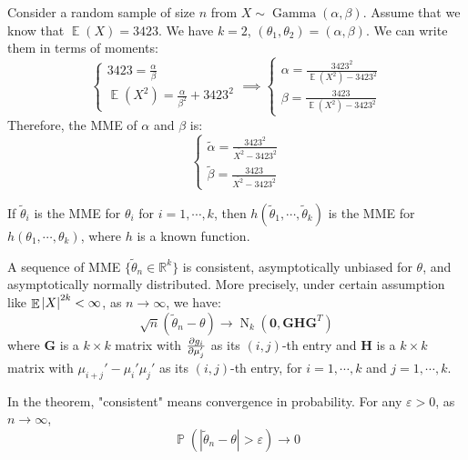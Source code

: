 \documentclass{huhtakm-template-book-v2}
\DeclareMathOperator{\prob}{\mathbb{P}}
\DeclareMathOperator{\E}{\mathbb{E}}
\DeclareMathOperator{\N}{N}
\DeclareMathOperator{\Gam}{Gamma}
\begin{document}
\begin{eg}
	Consider a random sample of size $n$ from $X\sim\Gam(\alpha,\beta)$. Assume that we know that $\E(X)=3423$. We have $k=2$, $(\theta_{1},\theta_{2})=(\alpha,\beta)$. We can write them in terms of moments:
	\begin{equation*}
		\begin{cases}
			3423=\frac{\alpha}{\beta}\\
			\E(X^{2})=\frac{\alpha}{\beta^{2}}+3423^{2}
		\end{cases}\implies\begin{cases}
			\alpha=\frac{3423^{2}}{\E(X^{2})-3423^{2}}\\
			\beta=\frac{3423}{\E(X^{2})-3423^{2}}
		\end{cases}
	\end{equation*}
	Therefore, the MME of $\alpha$ and $\beta$ is:
	\begin{equation*}
		\begin{cases}
			\widetilde{\alpha}=\frac{3423^{2}}{\overline{X^{2}}-3423^{2}}\\
			\widetilde{\beta}=\frac{3423}{\overline{X^{2}}-3423^{2}}
		\end{cases}
	\end{equation*}
\end{eg}
\begin{lem}
	If $\widetilde{\theta}_{i}$ is the MME for $\theta_{i}$ for $i=1,\cdots,k$, then $h(\widetilde{\theta}_{1},\cdots,\widetilde{\theta}_{k})$ is the MME for $h(\theta_{1},\cdots,\theta_{k})$, where $h$ is a known function.
\end{lem}
\begin{thm}
	\label{Chapter 2 (Thoerem) Sequence of MME is asympt. normal}
	A sequence of MME $\{\widetilde{\theta}_{n}\in\mathbb{R}^{k}\}$ is consistent, asymptotically unbiased for $\theta$, and asymptotically normally distributed. More precisely, under certain assumption like $\E\abs{X}^{2k}<\infty$, as $n\to\infty$, we have:
	\begin{equation*}
		\sqrt{n}(\widetilde{\theta}_{n}-\theta)\to\N_{k}(\mathbf{0},\mathbf{GHG}^{T})
	\end{equation*}
	where $\mathbf{G}$ is a $k\times k$ matrix with $\pdv{g_{i}}{\mu_{j}'}$ as its $(i,j)$-th entry and $\mathbf{H}$ is a $k\times k$ matrix with $\mu_{i+j}'-\mu_{i}'\mu_{j}'$ as its $(i,j)$-th entry, for $i=1,\cdots,k$ and $j=1,\cdots,k$.
\end{thm}
\begin{rem}
	In the theorem, "consistent" means convergence in probability. For any $\varepsilon>0$, as $n\to\infty$,
	\begin{equation*}
		\prob(|\widetilde{\theta}_{n}-\theta|>\varepsilon)\to 0
	\end{equation*}
\end{rem}
\end{document}
